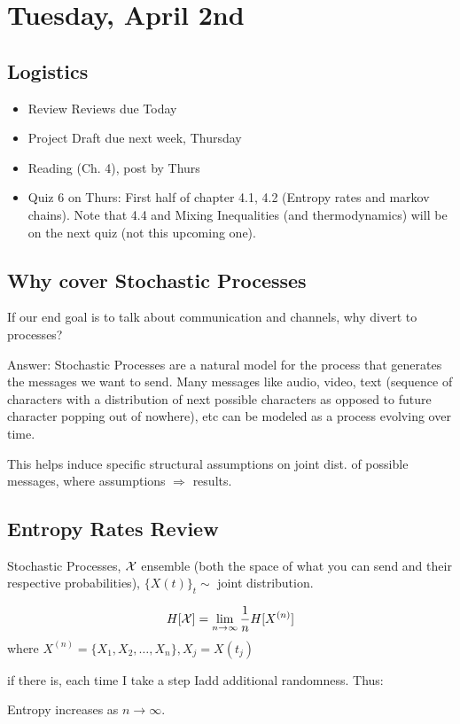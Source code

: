 \section{Tuesday, April 2nd}
\subsection{Logistics}
\begin{itemize}
    \item Review Reviews due Today
    \item Project Draft due next week, Thursday
    \item Reading (Ch. 4), post by Thurs
    \item Quiz 6 on Thurs: First half of chapter  4.1, 4.2 (Entropy rates and markov chains). Note that 4.4 and Mixing Inequalities (and thermodynamics) will be on the next quiz (not this upcoming one).
\end{itemize}

\subsection{Why cover Stochastic Processes}
If our end goal is to talk about communication and channels, why divert to processes?

\begin{shaded}
Answer: Stochastic Processes are a natural model for the process that generates the messages we want to send. Many messages like audio, video, text (sequence of characters with a distribution of next possible characters as opposed to future character popping out of nowhere), etc can be modeled as a process evolving over time.
\end{shaded}

This helps induce specific structural assumptions on joint dist. of possible messages, where assumptions $\Rightarrow$ results.

\subsection{Entropy Rates Review}
Stochastic Processes, $\mathcal{X}$ ensemble (both the space of what you can send and their respective probabilities), $\{X(t)\}_t\sim$ joint distribution.


$$
H[\mathcal{X}] = \lim_{n \rightarrow \infty} \frac{1}{n} H[X^{(n)}]
$$ where $X^{(n)} = \{X_1, X_2, \ldots, X_n \}, X_j = X(t_j)$

if there is, each time I take a step Iadd additional randomness. Thus:
\begin{shaded}
Entropy increases as $n\to\infty$.
\end{shaded}

